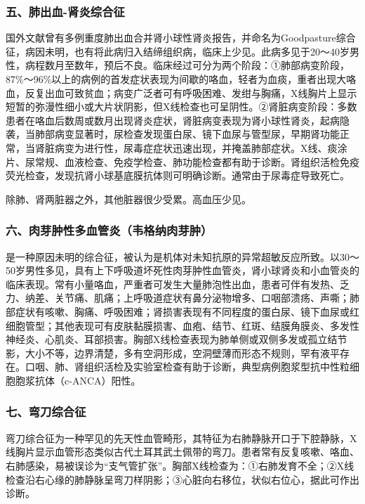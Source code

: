 \subsubsection{五、肺出血-肾炎综合征}

国外文献曾有多例重度肺出血合并肾小球性肾炎报告，并命名为Goodpasture综合征，病因未明，也有将此病归入结缔组织病，临床上少见。此病多见于20～40岁男性，病程数月至数年，预后不良。临床经过可分为两个阶段：①肺部病变阶段，87\%～96\%以上的病例的首发症状表现为间歇的咯血，轻者为血痰，重者出现大咯血，反复出血可致贫血；病变广泛者可有呼吸困难、发绀与胸痛，X线胸片上显示短暂的弥漫性细小或大片状阴影，但X线检查也可呈阴性。②肾脏病变阶段：多数患者在咯血后数周或数月出现肾炎症状，肾脏病变表现为肾小球性肾炎，起病隐袭，当肺部病变显著时，尿检查发现蛋白尿、镜下血尿与管型尿，早期肾功能正常，当肾脏病变为进行性，尿毒症症状迅速出现，并掩盖肺部症状。X线、痰涂片、尿常规、血液检查、免疫学检查、肺功能检查都有助于诊断。肾组织活检免疫荧光检查，发现抗肾小球基底膜抗体则可明确诊断。通常由于尿毒症导致死亡。

除肺、肾两脏器之外，其他脏器很少受累。高血压少见。

\subsubsection{六、肉芽肿性多血管炎（韦格纳肉芽肿）}

是一种原因未明的综合征，被认为是机体对未知抗原的异常超敏反应所致。以30～50岁男性多见，具有上下呼吸道坏死性肉芽肿性血管炎，肾小球肾炎和小血管炎的临床表现。常有小量咯血，严重者可发生大量肺泡性出血，患者可伴有发热、乏力、纳差、关节痛、肌痛；上呼吸道症状有鼻分泌物增多、口咽部溃疡、声嘶；肺部症状有咳嗽、胸痛、呼吸困难；肾损害表现有不同程度的蛋白尿、镜下血尿或红细胞管型；其他表现可有皮肤黏膜损害、血疱、结节、红斑、结膜角膜炎、多发性神经炎、心肌炎、耳部损害。胸部X线检查表现为肺单侧或双侧多发或孤立结节影，大小不等，边界清楚，多有空洞形成，空洞壁薄而形态不规则，罕有液平存在。口咽、肺、肾组织活检及实验室检查有助于诊断，典型病例胞浆型抗中性粒细胞胞浆抗体（c-ANCA）阳性。

\subsubsection{七、弯刀综合征}

弯刀综合征为一种罕见的先天性血管畸形，其特征为右肺静脉开口于下腔静脉，X线胸片显示血管形态类似古代土耳其武土佩带的弯刀。患者常有反复咳嗽、咯血、右肺感染，易被误诊为“支气管扩张”。胸部X线检查为：①右肺发育不全；②X线检查沿右心缘的肺静脉呈弯刀样阴影；③心脏向右移位，状似右位心，据此可作出诊断。

